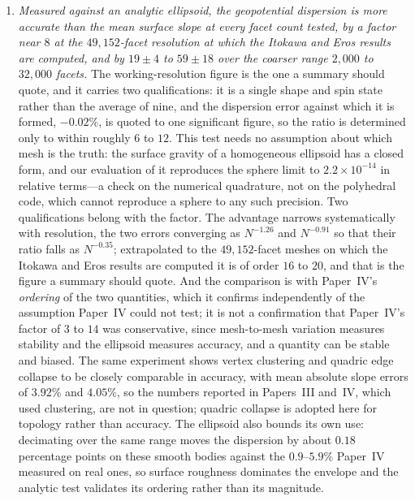 \begin{enumerate}
\item \emph{Measured against an analytic ellipsoid, the geopotential
dispersion is more accurate than the mean surface slope at every facet count
tested, by a factor near $8$ at the $49{,}152$-facet resolution at which the
Itokawa and Eros results are computed, and by $19\pm4$ to $59\pm18$ over the
coarser range $2{,}000$ to $32{,}000$ facets.} The working-resolution figure
is the one a summary should quote, and it carries two qualifications: it is a
single shape and spin state rather than the average of nine, and the
dispersion error against which it is formed, $-0.02\%$, is quoted to one
significant figure, so the ratio is determined only to within roughly $6$ to
$12$. This test needs no assumption about which mesh is the
truth: the surface gravity of a homogeneous ellipsoid has a closed form,
and our evaluation of it reproduces the sphere limit to
$2.2\times10^{-14}$ in relative terms---a check on the numerical
quadrature, not on the polyhedral code, which cannot reproduce a sphere to
any such precision. Two qualifications belong with the factor. The
advantage narrows systematically with resolution, the two errors
converging as $N^{-1.26}$ and $N^{-0.91}$ so that their ratio falls as
$N^{-0.35}$; extrapolated to the $49{,}152$-facet meshes on which the
Itokawa and Eros results are computed it is of order $16$ to $20$, and
that is the figure a summary should quote. And the comparison is with
Paper~IV's \emph{ordering} of the two quantities, which it confirms
independently of the assumption Paper~IV could not test; it is not a
confirmation that Paper~IV's factor of $3$ to $14$ was conservative, since
mesh-to-mesh variation measures stability and the ellipsoid measures
accuracy, and a quantity can be stable and biased. The same experiment
shows vertex clustering and quadric edge collapse to be closely comparable
in accuracy, with mean absolute slope errors of $3.92\%$ and $4.05\%$, so
the numbers reported in Papers~III and~IV, which used clustering, are not
in question; quadric collapse is adopted here for topology rather than
accuracy. The ellipsoid also bounds its own use: decimating over the same
range moves the dispersion by about $0.18$ percentage points on these
smooth bodies against the $0.9$--$5.9\%$ Paper~IV measured on real ones,
so surface roughness dominates the envelope and the analytic test
validates its ordering rather than its magnitude.

\end{enumerate}

